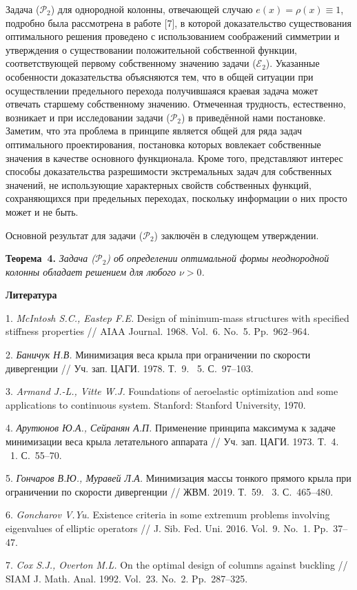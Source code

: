 %
%
%
%
%
\par
Задача ($\mathcal{P}_2$) для однородной колонны, отвечающей случаю $e(x) = \rho(x) \equiv 1$,
подробно была рассмотрена в работе [7],
в которой
доказательство существования оптимального решения проведено с использованием
соображений симметрии
и
утверждения о существовании положительной собственной функции, соответствующей первому собственному значению
задачи ($\mathcal{E}_2$).
%
%
%
Указанные особенности доказательства объясняются тем,
что в общей ситуации
при осуществлении предельного перехода получившаяся краевая задача
может отвечать старшему собственному значению.
%
%
%
Отмеченная трудность, естественно, возникает и при исследовании задачи
($\mathcal{P}_2$) в приведённой нами постановке.
%
%
%
Заметим, что эта проблема в принципе является общей для ряда задач оптимального проектирования,
постановка которых вовлекает собственные значения в качестве основного функционала.
%
%
%
Кроме того,
представляют интерес способы доказательства разрешимости
экстремальных задач для собственных значений,
не использующие характерных свойств собственных функций,
сохраняющихся при предельных переходах,
поскольку информации о них просто может и не быть.
%
%
%
%
%
\par
Основной результат для задачи ($\mathcal{P}_2$) заключён в
следующем утверждении.

\textbf{Теорема~4.} {\it Задача \emph{($\mathcal{P}_2$)} об определении оптимальной формы неоднородной колонны обладает решением для любого $\nu > 0$.}
%
%
%
\par



\smallskip \centerline {\bf Литература} \nopagebreak

1. {\it McIntosh S.C., Eastep F.E.}
Design of minimum-mass structures with specified stiffness properties
// AIAA Journal. 1968. Vol.~6. No.~5. Pp.~962\nobreakdash--964.

2. {\it Баничук Н.В.}
Минимизация веса крыла при ограничении по скорости дивергенции
// Уч. зап. ЦАГИ. 1978. Т.~9. \textnumero~5. С.~97\nobreakdash--103.

3. {\it Armand J.-L., Vitte W.J.}
Foundations of aeroelastic
\linebreak
optimization and some applications to continuous system.
\linebreak
Stanford: Stanford University, 1970.


4. {\it Арутюнов Ю.А., Сейранян А.П.}
Применение принципа максимума к задаче минимизации веса крыла
летательного аппарата
// Уч. зап. ЦАГИ. 1973. Т.~4. \textnumero~1. С.~55\nobreakdash--70.


5. {\it Гончаров В.Ю., Муравей Л.А.}
Минимизация массы тонкого прямого крыла при ограничении по скорости дивергенции
// ЖВМ. 2019. Т.~59. \textnumero~3. С.~465\nobreakdash--480.

6. {\it Goncharov V.Yu.}
Existence criteria in some extremum problems involving eigenvalues of elliptic operators
// J. Sib. Fed. Uni. 2016. Vol.~9. No.~1. Pp.~37\nobreakdash--47.

7. {\it Cox S.J., Overton M.L.}
On the optimal design of columns against buckling
// SIAM J. Math. Anal. 1992. Vol.~23. No.~2. Pp.~287\nobreakdash--325.
